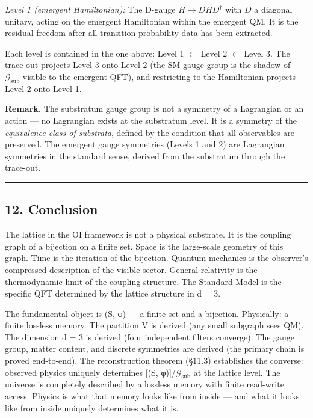 \documentclass[
  11pt,
]{article}
\begin{document}
\emph{Level 1 (emergent Hamiltonian):} The D-gauge \(H \to DHD^\dagger\)
with \(D\) a diagonal unitary, acting on the emergent Hamiltonian within
the emergent QM. It is the residual freedom after all
transition-probability data has been extracted.

Each level is contained in the one above: Level 1 \(\subset\) Level 2
\(\subset\) Level 3. The trace-out projects Level 3 onto Level 2 (the SM
gauge group is the shadow of \(\mathcal{G}_{\text{sub}}\) visible to the
emergent QFT), and restricting to the Hamiltonian projects Level 2 onto
Level 1.

\textbf{Remark.} The substratum gauge group is not a symmetry of a
Lagrangian or an action --- no Lagrangian exists at the substratum
level. It is a symmetry of the \emph{equivalence class of substrata},
defined by the condition that all observables are preserved. The
emergent gauge symmetries (Levels 1 and 2) are Lagrangian symmetries in
the standard sense, derived from the substratum through the trace-out.

\begin{center}\rule{0.5\linewidth}{0.5pt}\end{center}

\hypertarget{conclusion}{%
\subsection{12. Conclusion}\label{conclusion}}

The lattice in the OI framework is not a physical substrate. It is the
coupling graph of a bijection on a finite set. Space is the large-scale
geometry of this graph. Time is the iteration of the bijection. Quantum
mechanics is the observer's compressed description of the visible
sector. General relativity is the thermodynamic limit of the coupling
structure. The Standard Model is the specific QFT determined by the
lattice structure in d = 3.

The fundamental object is (S, φ) --- a finite set and a bijection.
Physically: a finite lossless memory. The partition V is derived (any
small subgraph sees QM). The dimension d = 3 is derived (four
independent filters converge). The gauge group, matter content, and
discrete symmetries are derived (the primary chain is proved
end-to-end). The reconstruction theorem (§11.3) establishes the
converse: observed physics uniquely determines {[}(S,
φ){]}/\(\mathcal{G}_{\text{sub}}\) at the lattice level. The universe is
completely described by a lossless memory with finite read-write access.
Physics is what that memory looks like from inside --- and what it looks
like from inside uniquely determines what it is.
\end{document}
